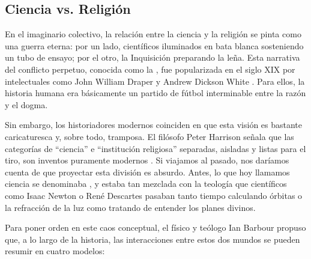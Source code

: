 \subsection*{Ciencia vs. Religión}
\label{sub:cienciavsreligion}

En el imaginario colectivo, la relación entre la ciencia y la religión se pinta como una guerra eterna: por un lado, científicos iluminados en bata blanca sosteniendo un tubo de ensayo; por el otro, la Inquisición preparando la leña.
Esta narrativa del conflicto perpetuo, conocida como la , fue popularizada en el siglo XIX por intelectuales como John William Draper y Andrew Dickson White \cite{Draper1874, White1896}.
Para ellos, la historia humana era básicamente un partido de fútbol interminable entre la razón y el dogma.

Sin embargo, los historiadores modernos coinciden en que esta visión es bastante caricaturesca y, sobre todo, tramposa.
El filósofo Peter Harrison señala que las categorías de “ciencia” e “institución religiosa” separadas, aisladas y listas para el tiro, son inventos puramente modernos \cite{Harrison2015}.
Si viajamos al pasado, nos daríamos cuenta de que proyectar esta división es absurdo.
Antes, lo que hoy llamamos ciencia se denominaba , y estaba tan mezclada con la teología que científicos como Isaac Newton o René Descartes pasaban tanto tiempo calculando órbitas o la refracción de la luz como tratando de entender los planes divinos.

Para poner orden en este caos conceptual, el físico y teólogo Ian Barbour propuso que, a lo largo de la historia, las interacciones entre estos dos mundos se pueden resumir en cuatro modelos\cite{Barbour1997}:

